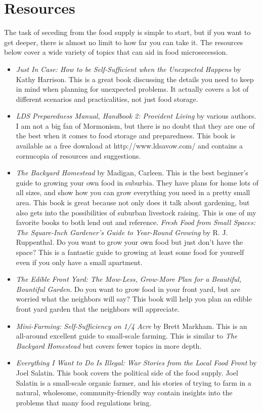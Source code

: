 \section{Resources}

The task of seceding from the food supply is simple to start, but if you
want to get deeper, there is almost no limit to how far you can take
it.  The resources below cover a wide variety of topics that can aid
in food microsecession.

\begin{itemize}
\item 
\textit{Just In Case: How to be Self-Sufficient when the Unexpected Happens} by Kathy Harrison.  
This is a great book discussing the details you need to keep in mind when planning for
unexpected problems.  It actually covers a lot of different scenarios and practicalities, 
not just food storage.
\item 
\textit{LDS Preparedness Manual, Handbook 2: Provident Living} by various authors.  I am
not a big fan of Mormonism, but there is no doubt that they are one of the best when it 
comes to food storage and preparedness.  This book is available as a free download at http://www.ldsavow.com/
and contains a cornucopia of resources and suggestions.
\item 
\textit{The Backyard Homestead} by Madigan, Carleen.  This is the best beginner's guide to 
growing your own food in suburbia.  They have plans for home lots of all sizes, and show
how you can grow everything you need in a pretty small area.  This book is great because
not only does it talk about gardening, but also gets into the possibilities of suburban 
livestock raising.  This is one of my favorite books to both lend out and reference.
\textit{Fresh Food from Small Spaces: The Square-Inch Gardener’s Guide to Year-Round Growing} by R. J. Ruppenthal. 
Do you want to grow your own food but just don't have the space?  This is a fantastic guide to
growing at least some food for yourself even if you only have a small apartment. 
\item 
\textit{The Edible Front Yard:  The Mow-Less, Grow-More Plan for a Beautiful, Bountiful Garden}.  Do you
want to grow food in your front yard, but are worried what the neighbors will say?  This book will help 
you plan an edible front yard garden that the neighbors will appreciate.
\item 
\textit{Mini-Farming: Self-Sufficiency on 1/4 Acre} by Brett Markham.  This is an all-around excellent
guide to small-scale farming.  This is similar to \textit{The Backyard Homestead} but covers fewer
topics in more depth. 
\item 
\textit{Everything I Want to Do Is Illegal: War Stories from the Local Food Front} by Joel Salatin.
This book covers the political side of the food supply.  Joel Salatin is a small-scale organic farmer,
and his stories of trying to farm in a natural, wholesome, community-friendly way contain insights
into the problems that many food regulations bring.
\end{itemize}
